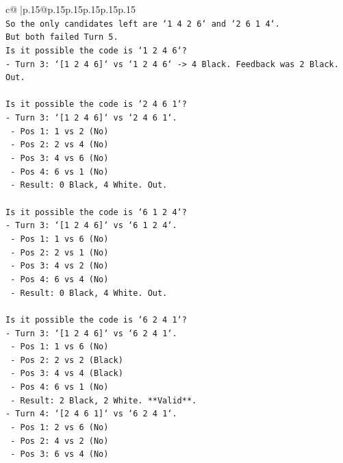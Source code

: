 \documentclass{article}
\begin{document}
{\begin{supertabular}{c@{$\;$}|p{.15\linewidth}@{}p{.15\linewidth}p{.15\linewidth}p{.15\linewidth}p{.15\linewidth}p{.15\linewidth}}
{{{\\ 
\texttt{So the only candidates left are `1 4 2 6` and `2 6 1 4`.} \\
\texttt{But both failed Turn 5.} \\
\texttt{Is it possible the code is `1 2 4 6`?} \\
\texttt{{-} Turn 3: `{[}1 2 4 6{]}` vs `1 2 4 6` {-}> 4 Black. Feedback was 2 Black. Out.} \\
\\ 
\texttt{Is it possible the code is `2 4 6 1`?} \\
\texttt{{-} Turn 3: `{[}1 2 4 6{]}` vs `2 4 6 1`.} \\
\texttt{  {-} Pos 1: 1 vs 2 (No)} \\
\texttt{  {-} Pos 2: 2 vs 4 (No)} \\
\texttt{  {-} Pos 3: 4 vs 6 (No)} \\
\texttt{  {-} Pos 4: 6 vs 1 (No)} \\
\texttt{  {-} Result: 0 Black, 4 White. Out.} \\
\\ 
\texttt{Is it possible the code is `6 1 2 4`?} \\
\texttt{{-} Turn 3: `{[}1 2 4 6{]}` vs `6 1 2 4`.} \\
\texttt{  {-} Pos 1: 1 vs 6 (No)} \\
\texttt{  {-} Pos 2: 2 vs 1 (No)} \\
\texttt{  {-} Pos 3: 4 vs 2 (No)} \\
\texttt{  {-} Pos 4: 6 vs 4 (No)} \\
\texttt{  {-} Result: 0 Black, 4 White. Out.} \\
\\ 
\texttt{Is it possible the code is `6 2 4 1`?} \\
\texttt{{-} Turn 3: `{[}1 2 4 6{]}` vs `6 2 4 1`.} \\
\texttt{  {-} Pos 1: 1 vs 6 (No)} \\
\texttt{  {-} Pos 2: 2 vs 2 (Black)} \\
\texttt{  {-} Pos 3: 4 vs 4 (Black)} \\
\texttt{  {-} Pos 4: 6 vs 1 (No)} \\
\texttt{  {-} Result: 2 Black, 2 White. **Valid**.} \\
\texttt{{-} Turn 4: `{[}2 4 6 1{]}` vs `6 2 4 1`.} \\
\texttt{  {-} Pos 1: 2 vs 6 (No)} \\
\texttt{  {-} Pos 2: 4 vs 2 (No)} \\
\texttt{  {-} Pos 3: 6 vs 4 (No)} \\
}}}
\end{supertabular}}
\end{document}
